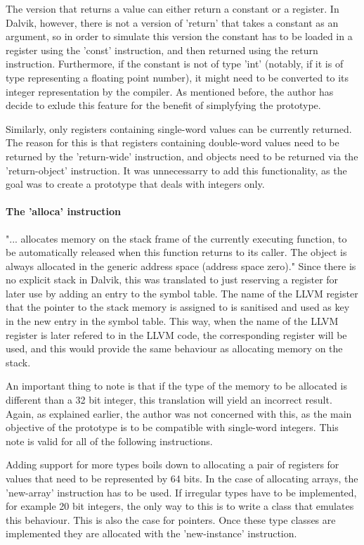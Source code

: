 \documentclass[parskip]{cs4rep}
\begin{document}
The version that returns a value can either return a constant or a register. In Dalvik, however, there is not a version of 'return' that takes a constant as an argument, so in order to simulate this version the constant has to be loaded in a register using the 'const' instruction, and then returned using the return instruction. Furthermore, if the constant is not of type 'int' (notably, if it is of type representing a floating point number), it might need to be converted to its integer representation by the compiler. As mentioned before, the author has decide to exlude this feature for the benefit of simplyfying the prototype.

Similarly, only registers containing single-word values can be currently returned. The reason for this is that registers containing double-word values need to be returned by the 'return-wide' instruction, and objects need to be returned via the 'return-object' instruction. It was unnecessarry to add this functionality, as the goal was to create a prototype that deals with integers only.

\paragraph{The 'alloca' instruction} "... allocates memory on the stack frame of the currently executing function, to be automatically released when this function returns to its caller. The object is always allocated in the generic address space (address space zero)."\cite{P11} Since there is no explicit stack in Dalvik, this was translated to just reserving a register for later use by adding an entry to the symbol table. The name of the LLVM register that the pointer to the stack memory is assigned to is sanitised and used as key in the new entry in the symbol table. This way, when the name of the LLVM register is later refered to in the LLVM code, the corresponding register will be used, and this would provide the same behaviour as allocating memory on the stack.

An important thing to note is that if the type of the memory to be allocated is different than a 32 bit integer, this translation will yield an incorrect result. Again, as explained earlier, the author was not concerned with this, as the main objective of the prototype is to be compatible with single-word integers. This note is valid for all of the following instructions.

Adding support for more types boils down to allocating a pair of registers for values that need to be represented by 64 bits. In the case of allocating arrays, the 'new-array' instruction has to be used. If irregular types have to be implemented, for example 20 bit integers, the only way to this is to write a class that emulates this behaviour. This is also the case for pointers. Once these type classes are implemented they are allocated with the 'new-instance' instruction.
\end{document}
